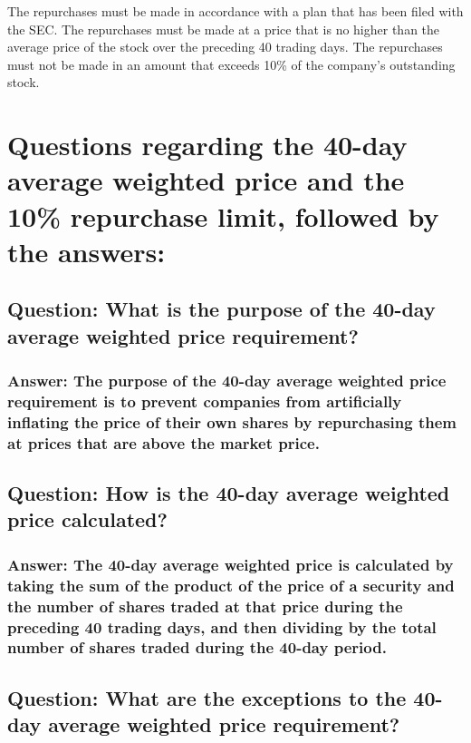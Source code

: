 \documentclass[11pt]{article}
\begin{document}
The repurchases must be made in accordance with a plan that has been filed with the SEC.
The repurchases must be made at a price that is no higher than the average price of the stock over the preceding 40 trading days.
The repurchases must not be made in an amount that exceeds 10\% of the company's outstanding stock.


\section{Questions regarding the 40-day average weighted price and the 10\% repurchase limit, followed by the answers:}
\label{sec:org2f9ec4a}

\subsection{Question: What is the purpose of the 40-day average weighted price requirement?}
\label{sec:orgcce3717}

\subsubsection{Answer: The purpose of the 40-day average weighted price requirement is to prevent companies from artificially inflating the price of their own shares by repurchasing them at prices that are above the market price.}
\label{sec:org653df8e}

\subsection{Question: How is the 40-day average weighted price calculated?}
\label{sec:org4bcf635}

\subsubsection{Answer: The 40-day average weighted price is calculated by taking the sum of the product of the price of a security and the number of shares traded at that price during the preceding 40 trading days, and then dividing by the total number of shares traded during the 40-day period.}
\label{sec:org4e773eb}

\subsection{Question: What are the exceptions to the 40-day average weighted price requirement?}
\label{sec:org5342122}
\end{document}

